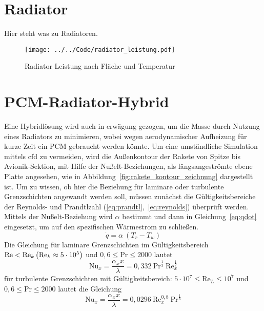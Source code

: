 \newpage
\section{Radiator}\label{sec:Radiator}
Hier steht was zu Radiatoren.
\begin{figure}[H]
  \centering
  \texttt{[image: ../../Code/radiator\_leistung.pdf]}
  \caption{Radiator Leistung nach Fläche und Temperatur}\label{fig:pcm_heatflux}
\end{figure}
\newpage
\section{PCM-Radiator-Hybrid}\label{sec:pcmRadiatorHybrid}
Eine Hybridlösung wird auch in erwägung gezogen, um die Masse durch Nutzung eines Radiators zu minimieren, wobei wegen aerodynamischer Aufheizung für kurze Zeit ein PCM gebraucht werden könnte.
Um eine umständliche Simulation mittels \ac{cfd} zu vermeiden, wird die Außenkontour der Rakete von Spitze bis Avionik-Sektion, mit Hilfe der Nußelt-Beziehungen, als längsangeströmte ebene Platte angesehen,
wie in Abbildung~\ref{fig:rakete_kontour_zeichnung} dargestellt ist.
Um zu wissen, ob hier die Beziehung für laminare oder turbulente Grenzschichten angewandt werden soll, müssen zunächst die Gültigkeitsbereiche der Reynolds- und Prandtlzahl (\ref{eq:prandtl},~\ref{eq:reynolds}) überprüft werden.
Mittels der Nußelt-Beziehung wird $\alpha$ bestimmt und dann in Gleichung~\ref{eq:qdot} eingesetzt, um auf den spezifischen Wärmestrom zu schließen.
\begin{equation}
  \label{eq:qdot}
  \dot{q} = \alpha \ (T_r - T_w)
\end{equation}
Die Gleichung für laminare Grenzschichten im Gültigkeitsbereich $\text{Re} < \text{Re}_k\\\left(\text{Re}_k \approx 5 \cdot 10^5\right)$ und $0,6 \leq \text{Pr} \leq 2000$ lautet
\begin{equation}
  \label{eq:nusselt_laminar}
  \text{Nu}_x = \frac{\alpha_x x}{\lambda} = 0,332 \ \text{Pr}^{\frac{1}{3}} \ \text{Re}_x^{\frac{1}{2}}
\end{equation}
für turbulente Grenzschichten mit Gültigkeitsbereich: $5 \cdot 10^7 \leq \text{Re}_L \leq 10^7$ und $ 0,6 \leq \text{Pr} \leq 2000$ lautet die Gleichung
\begin{equation}
  \label{eq:nusselt_turbulent}
  \text{Nu}_x = \frac{\alpha_x x}{\lambda} = 0,0296 \ \text{Re}_x^{0,8} \ \text{Pr}^{\frac{1}{3}}
\end{equation}

